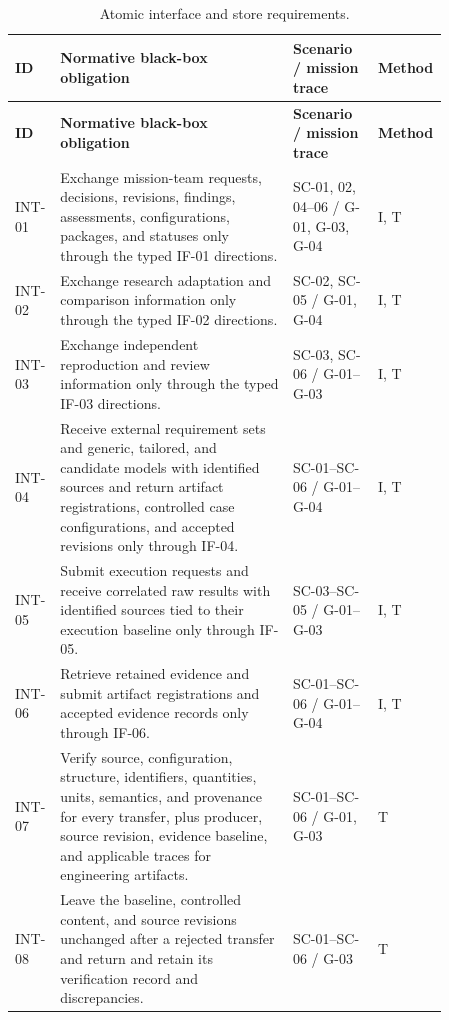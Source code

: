 \documentclass[11pt,a4paper]{article}
\begin{document}
\begin{longtable}{>{\raggedright\arraybackslash}p{0.07\linewidth} >{\raggedright\arraybackslash}p{0.52\linewidth} >{\raggedright\arraybackslash}p{0.19\linewidth} >{\raggedright\arraybackslash}p{0.08\linewidth}}
    \caption{Atomic interface and store requirements.}\label{tab:framework-interface-store-requirements}\\
    \toprule
    \textbf{ID} & \textbf{Normative black-box obligation} & \textbf{Scenario / mission trace} & \textbf{Method} \\
    \midrule
    \endfirsthead
    \toprule
    \textbf{ID} & \textbf{Normative black-box obligation} & \textbf{Scenario / mission trace} & \textbf{Method} \\
    \midrule
    \endhead
    INT-01 & Exchange mission-team requests, decisions, revisions, findings, assessments, configurations, packages, and statuses only through the typed IF-01 directions. & SC-01, 02, 04--06 / G-01, G-03, G-04 & I, T \\
    INT-02 & Exchange research adaptation and comparison information only through the typed IF-02 directions. & SC-02, SC-05 / G-01, G-04 & I, T \\
    INT-03 & Exchange independent reproduction and review information only through the typed IF-03 directions. & SC-03, SC-06 / G-01--G-03 & I, T \\
    INT-04 & Receive external requirement sets and generic, tailored, and candidate models with identified sources and return artifact registrations, controlled case configurations, and accepted revisions only through IF-04. & SC-01--SC-06 / G-01--G-04 & I, T \\
    INT-05 & Submit execution requests and receive correlated raw results with identified sources tied to their execution baseline only through IF-05. & SC-03--SC-05 / G-01--G-03 & I, T \\
    INT-06 & Retrieve retained evidence and submit artifact registrations and accepted evidence records only through IF-06. & SC-01--SC-06 / G-01--G-04 & I, T \\
    INT-07 & Verify source, configuration, structure, identifiers, quantities, units, semantics, and provenance for every transfer, plus producer, source revision, evidence baseline, and applicable traces for engineering artifacts. & SC-01--SC-06 / G-01, G-03 & T \\
    INT-08 & Leave the baseline, controlled content, and source revisions unchanged after a rejected transfer and return and retain its verification record and discrepancies. & SC-01--SC-06 / G-03 & T \\

\end{longtable}
\end{document}
